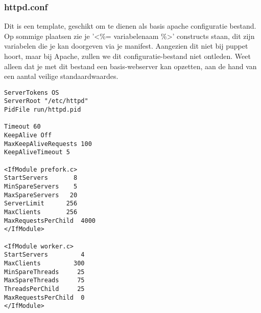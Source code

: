 \subsubsection{httpd.conf}
Dit is een template, geschikt om te dienen als basis apache configuratie bestand. Op sommige plaatsen zie je '<\%= variabelenaam \%>' constructs staan, dit zijn variabelen die je kan doorgeven via je manifest. Aangezien dit niet bij puppet hoort, maar bij Apache, zullen we dit configuratie-bestand niet ontleden. Weet alleen dat je met dit bestand een basis-webserver kan opzetten, aan de hand van een aantal veilige standaardwaardes.
\begin{code}
\begin{lstlisting}
ServerTokens OS
ServerRoot "/etc/httpd"
PidFile run/httpd.pid

Timeout 60
KeepAlive Off
MaxKeepAliveRequests 100
KeepAliveTimeout 5

<IfModule prefork.c>
StartServers       8
MinSpareServers    5
MaxSpareServers   20
ServerLimit      256
MaxClients       256
MaxRequestsPerChild  4000
</IfModule>

<IfModule worker.c>
StartServers         4
MaxClients         300
MinSpareThreads     25
MaxSpareThreads     75 
ThreadsPerChild     25
MaxRequestsPerChild  0
</IfModule>
\end{lstlisting}
\end{code}
